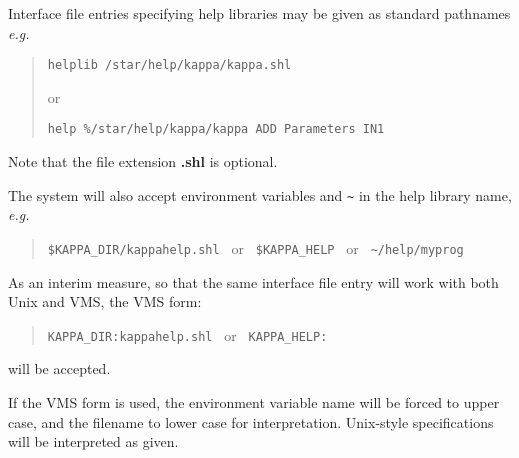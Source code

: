 Interface file entries specifying help libraries may be given as standard
pathnames {\em e.g.}
\begin{quote} 
\begin{verbatim}
helplib /star/help/kappa/kappa.shl
\end{verbatim}
or
\begin{verbatim}
help %/star/help/kappa/kappa ADD Parameters IN1
\end{verbatim} 
\end{quote}
Note that the file extension {\bf .shl} is optional.

The system will also accept environment variables and \verb!~! in the help 
library name, {\em e.g.}
\begin{quote} 
\verb!$KAPPA_DIR/kappahelp.shl ! or \verb! $KAPPA_HELP ! or
\verb! ~/help/myprog!
\end{quote}

As an interim measure, so that the same interface file entry will work with
both Unix and VMS, the VMS form:
\begin{quote} 
\verb!KAPPA_DIR:kappahelp.shl ! or \verb! KAPPA_HELP:!
\end{quote}
will be accepted.

If the VMS form is used, the environment variable name will be forced to upper
case, and the filename to lower case for interpretation. 
Unix-style specifications will be interpreted as given.

